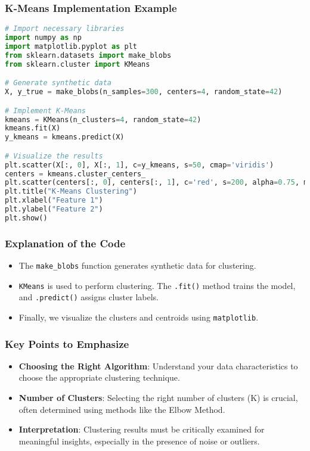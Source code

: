 \documentclass[aspectratio=169]{beamer}
\begin{document}
\begin{frame}[fragile]
    \frametitle{K-Means Implementation Example}
    \begin{lstlisting}[language=Python]
# Import necessary libraries
import numpy as np
import matplotlib.pyplot as plt
from sklearn.datasets import make_blobs
from sklearn.cluster import KMeans

# Generate synthetic data
X, y_true = make_blobs(n_samples=300, centers=4, random_state=42)

# Implement K-Means
kmeans = KMeans(n_clusters=4, random_state=42)
kmeans.fit(X)
y_kmeans = kmeans.predict(X)

# Visualize the results
plt.scatter(X[:, 0], X[:, 1], c=y_kmeans, s=50, cmap='viridis')
centers = kmeans.cluster_centers_
plt.scatter(centers[:, 0], centers[:, 1], c='red', s=200, alpha=0.75, marker='X')
plt.title("K-Means Clustering")
plt.xlabel("Feature 1")
plt.ylabel("Feature 2")
plt.show()
    \end{lstlisting}
\end{frame}

\begin{frame}
    \frametitle{Explanation of the Code}
    \begin{itemize}
        \item The \texttt{make\_blobs} function generates synthetic data for clustering.
        \item \texttt{KMeans} is used to perform clustering. The \texttt{.fit()} method trains the model, and \texttt{.predict()} assigns cluster labels.
        \item Finally, we visualize the clusters and centroids using \texttt{matplotlib}.
    \end{itemize}
\end{frame}

\begin{frame}
    \frametitle{Key Points to Emphasize}
    \begin{itemize}
        \item \textbf{Choosing the Right Algorithm}: Understand your data characteristics to choose the appropriate clustering technique.
        \item \textbf{Number of Clusters}: Selecting the right number of clusters (K) is crucial, often determined using methods like the Elbow Method.
        \item \textbf{Interpretation}: Clustering results must be critically examined for meaningful insights, especially in the presence of noise or outliers.
    \end{itemize}
\end{frame}
\end{document}
